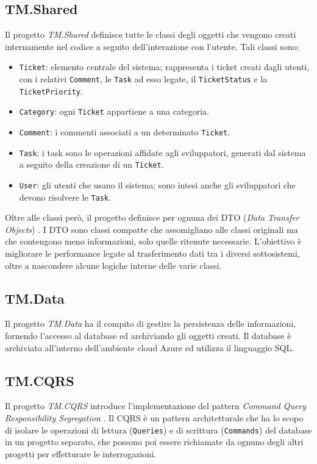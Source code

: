 \subsection{TM.Shared}
Il progetto \textit{TM.Shared} definisce tutte le classi degli oggetti che vengono creati internamente nel codice a seguito dell'interazione
con l'utente. Tali classi sono:
\begin{itemize}
    \item \texttt{Ticket}: elemento centrale del sistema; rappresenta i ticket creati dagli utenti, con i relativi \texttt{Comment},
        le \texttt{Task} ad esso legate, il \texttt{TicketStatus} e la \texttt{TicketPriority}.
    \item \texttt{Category}: ogni \texttt{Ticket} appartiene a una categoria.
    \item \texttt{Comment}: i commenti associati a un determinato \texttt{Ticket}.
    \item \texttt{Task}: i task sono le operazioni affidate agli sviluppatori, generati dal sistema a seguito della creazione
        di un \texttt{Ticket}.
    \item \texttt{User}: gli utenti che usano il sistema; sono intesi anche gli sviluppatori che devono risolvere le \texttt{Task}.
\end{itemize}
Oltre alle classi però, il progetto definisce per ognuna dei DTO (\textit{Data Transfer Objects}) \cite{microsoft_webapi_ef_part5}.
I DTO sono classi compatte che assomigliano alle classi originali ma che contengono meno informazioni, solo quelle ritenute necessarie.
L'obiettivo è migliorare le performance legate al trasferimento dati tra i diversi sottosistemi, oltre a nascondere alcune logiche interne delle varie classi.

\subsection{TM.Data}
Il progetto \textit{TM.Data} ha il compito di gestire la persistenza delle informazioni, fornendo l'accesso al database
ed archiviando gli oggetti creati. Il database è archiviato all'interno dell'ambiente cloud Azure ed utilizza il linguaggio SQL.

\subsection{TM.CQRS}
Il progetto \textit{TM.CQRS} introduce l'implementazione del pattern \textit{Command Query Responsibility Segregation} \cite{azure_cqrs_msdocs}.
Il CQRS è un pattern architetturale che ha lo scopo di isolare le operazioni di lettura (\texttt{Queries}) e di scrittura (\texttt{Commands})
del database in un progetto separato, che possono poi essere richiamate da ognuno degli altri progetti per effetturare le interrogazioni.

